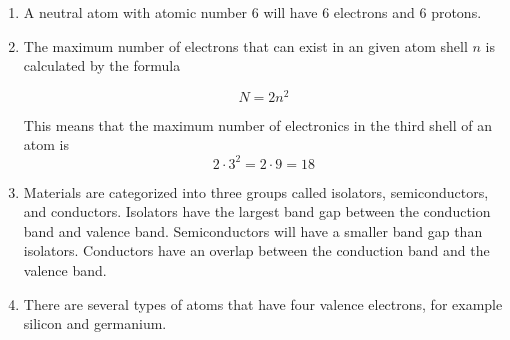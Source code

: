 \documentclass[fleqn]{article}
\begin{document}
\begin{enumerate}[label=\textbf{\arabic*.}]

\item A neutral atom with atomic number 6 will have 6 electrons and 6 protons. 
  
\item The maximum number of electrons that can exist in an given atom shell $ n $ is calculated by the formula

\[
  N = 2n^2
\]

This means that the maximum number of electronics in the third shell of an atom is
\[ 
  2 \cdot 3^2 = 2 \cdot 9 = 18
\]

\item
Materials are categorized into three groups called isolators, semiconductors, and conductors. Isolators have the largest band gap between the conduction band and valence band. Semiconductors will have a smaller band gap than isolators. Conductors have an overlap between the conduction band and the valence band.

\item
There are several types of atoms that have four valence electrons, for example silicon and germanium.
  
\end{enumerate}
\end{document}
